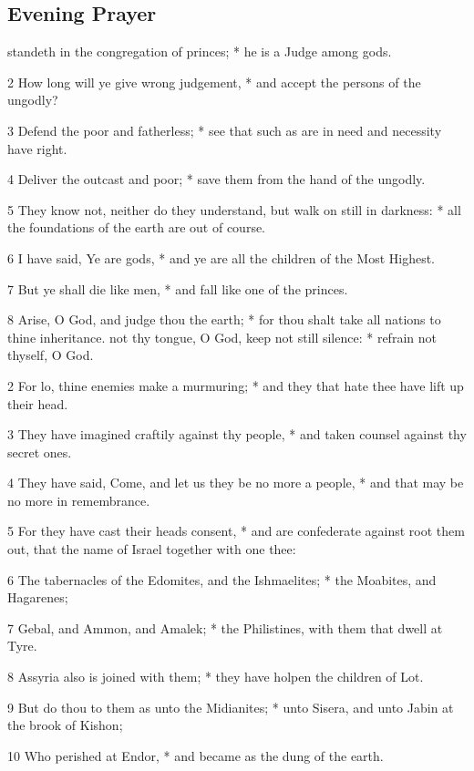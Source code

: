 \subsection{Evening Prayer}
 standeth in the congregation of princes; * he is a Judge among gods.\par
2 How long will ye give wrong judgement, * and accept the persons of the ungodly?\par
3 Defend the poor and fatherless; * see that such as are in need and necessity have right.\par
4 Deliver the outcast and poor; * save them from the hand of the ungodly.\par
5 They know not, neither do they understand, but walk on still in darkness: * all the foundations of the earth are out of course.\par
6 I have said, Ye are gods, * and ye are all the children of the Most Highest.\par
7 But ye shall die like men, * and fall like one of the princes.\par
8 Arise, O God, and judge thou the earth; * for thou shalt take all nations to thine inheritance.
 not thy tongue, O God, keep not still silence: * refrain not thyself, O God.\par
2 For lo, thine enemies make a murmuring; * and they that hate thee have lift up their head.\par
3 They have imagined craftily against thy people, * and taken counsel against thy secret ones.\par
4 They have said, Come, and let us they be no more a people, * and that may be no more in remembrance.\par
5 For they have cast their heads consent, * and are confederate against root them out, that the name of Israel together with one thee:\par
6 The tabernacles of the Edomites, and the Ishmaelites; * the Moabites, and Hagarenes;\par
7 Gebal, and Ammon, and Amalek; * the Philistines, with them that dwell at Tyre.\par
8 Assyria also is joined with them; * they have holpen the children of Lot.\par
9 But do thou to them as unto the Midianites; * unto Sisera, and unto Jabin at the brook of Kishon;\par
10 Who perished at Endor, * and became as the dung of the earth.\par
